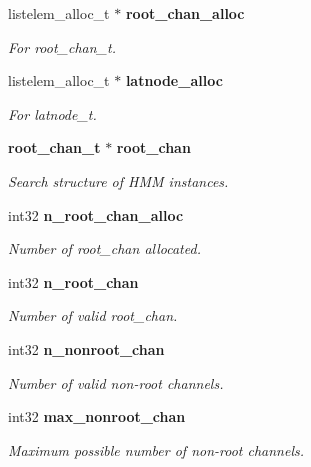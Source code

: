 \begin{DoxyCompactItemize}
listelem\+\_\+alloc\+\_\+t $\ast$ \textbf{ root\+\_\+chan\+\_\+alloc}
\begin{DoxyCompactList}\small\item\em For root\+\_\+chan\+\_\+t. \end{DoxyCompactList}\item 
\mbox{\label{structngram__search__s_a21600dc2e23744f0be9c64a4db8d7e50}} 
listelem\+\_\+alloc\+\_\+t $\ast$ \textbf{ latnode\+\_\+alloc}
\begin{DoxyCompactList}\small\item\em For latnode\+\_\+t. \end{DoxyCompactList}\item 
\textbf{ root\+\_\+chan\+\_\+t} $\ast$ \textbf{ root\+\_\+chan}
\begin{DoxyCompactList}\small\item\em Search structure of H\+MM instances. \end{DoxyCompactList}\item 
\mbox{\label{structngram__search__s_abc8a67e3f64adc470c78dfdd23be4126}} 
int32 \textbf{ n\+\_\+root\+\_\+chan\+\_\+alloc}
\begin{DoxyCompactList}\small\item\em Number of root\+\_\+chan allocated. \end{DoxyCompactList}\item 
\mbox{\label{structngram__search__s_a297d8bdb856617490ee8ccd99df70e68}} 
int32 \textbf{ n\+\_\+root\+\_\+chan}
\begin{DoxyCompactList}\small\item\em Number of valid root\+\_\+chan. \end{DoxyCompactList}\item 
\mbox{\label{structngram__search__s_a043723786367f5026dce99c261f7086d}} 
int32 \textbf{ n\+\_\+nonroot\+\_\+chan}
\begin{DoxyCompactList}\small\item\em Number of valid non-\/root channels. \end{DoxyCompactList}\item 
\mbox{\label{structngram__search__s_a4b2b42349e9e3df7e93b4a7d6994f63f}} 
int32 \textbf{ max\+\_\+nonroot\+\_\+chan}
\begin{DoxyCompactList}\small\item\em Maximum possible number of non-\/root channels. \end{DoxyCompactList}\item 
\mbox{\label{structngram__search__s_a1ffa3c9100252122ae8a2a713c50b527}} 

\end{DoxyCompactItemize}
